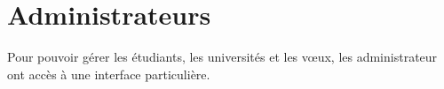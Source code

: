 \chapter{Administrateurs}
Pour pouvoir gérer les étudiants, les universités et les vœux, les administrateur ont accès à une interface particulière.